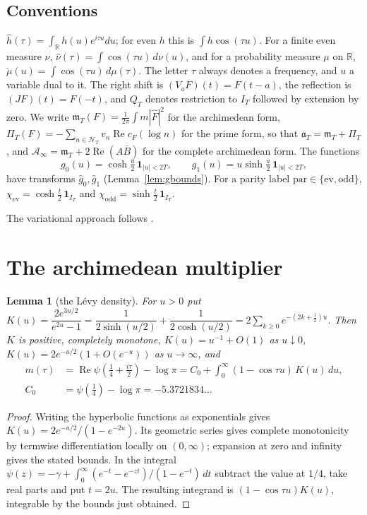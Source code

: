 \documentclass[10pt]{amsart}
\newtheorem{lemma}[theorem]{Lemma}
\theoremstyle{definition}
\theoremstyle{remark}
\newcommand{\R}{\mathbb R}
\newcommand{\Rel}{\operatorname{Re}}
\newcommand{\IT}{I_T}
\newcommand{\gh}[1]{\widehat g_{#1}}
\newcommand{\nuh}{\widehat\nu}
\newcommand{\Fh}{\widehat F}
\newcommand{\cF}{c_F}
\newcommand{\NT}{\mathcal N_T}
\newcommand{\Ainf}{\mathcal A_\infty}
\newcommand{\PiT}{\Pi_T}
\newcommand{\mT}{\mathfrak m_T}
\begin{document}
\subsection{Conventions}\label{subsec:conv}
$\widehat h(\tau)=\int_\R h(u)e^{i\tau u}du$; for even $h$ this is $\int h\cos(\tau u)$. For a finite even
measure $\nu$, $\nuh(\tau)=\int\cos(\tau u)\,d\nu(u)$, and for a probability measure $\mu$ on $\R$,
$\check\mu(u)=\int\cos(\tau u)\,d\mu(\tau)$. The letter $\tau$ always denotes a frequency, and $u$ a
variable dual to it. The right shift is $(V_aF)(t)=F(t-a)$, the reflection is $(JF)(t)=F(-t)$, and $Q_T$
denotes restriction to $\IT$ followed by extension by zero. We write $\mT(F)=\frac1{2\pi}\int m|\Fh|^2$
for the archimedean form, $\PiT(F)=-\sum_{n\in\NT}v_n\Rel\cF(\log n)$ for the prime form, so that
$\mathfrak a_T=\mT+\PiT$, and $\Ainf=\mT+2\Rel(A\bar B)$ for the complete archimedean form. The functions
\begin{equation}\label{eq:g}
g_0(u)=\cosh\tfrac u2\,\mathbf 1_{|u|<2T},\qquad g_1(u)=u\sinh\tfrac u2\,\mathbf 1_{|u|<2T},
\end{equation}
have transforms $\gh0,\gh1$ (Lemma~\ref{lem:gbounds}). For a parity label
$\mathrm{par}\in\{\mathrm{ev},\mathrm{odd}\}$, $\chi_{\mathrm{ev}}=\cosh\frac t2\,\mathbf 1_{\IT}$ and
$\chi_{\mathrm{odd}}=\sinh\frac t2\,\mathbf 1_{\IT}$. 

The variational approach follows \cite{Yoshida1992,Bombieri2000,Weil52,ConnesConsani2021}.

\section{The archimedean multiplier}\label{sec:levy}

\begin{lemma}[the L\'evy density]\label{lem:K}
For $u>0$ put $K(u)=\dfrac{2e^{3u/2}}{e^{2u}-1}=\dfrac{1}{2\sinh(u/2)}+\dfrac{1}{2\cosh(u/2)}
=2\sum_{k\ge0}e^{-(2k+\frac12)u}$. Then $K$ is positive, completely monotone,
$K(u)=u^{-1}+O(1)$ as $u\downarrow0$, $K(u)=2e^{-u/2}(1+O(e^{-u}))$ as $u\to\infty$, and
\begin{equation}\label{eq:m}
\begin{split}
m(\tau)&=\Rel\psi\!\left(\tfrac14+\tfrac{i\tau}2\right)-\log\pi
= C_0+\int_0^\infty(1-\cos\tau u)\,K(u)\,du,\\
C_0&=\psi(\tfrac14)-\log\pi=-5.3721834\ldots
\end{split}
\end{equation}
\end{lemma}
\begin{proof}
Writing the hyperbolic functions as exponentials gives
$K(u)=2e^{-u/2}/(1-e^{-2u})$. Its geometric series gives complete
monotonicity by termwise differentiation locally on $(0,\infty)$;
expansion at zero and infinity gives the stated bounds. In the integral
$\psi(z)=-\gamma+\int_0^\infty(e^{-t}-e^{-zt})/(1-e^{-t})\,dt$
subtract the value at $1/4$, take real parts and put $t=2u$.
The resulting integrand is $(1-\cos\tau u)K(u)$, integrable by
the bounds just obtained.
\end{proof}
\end{document}
